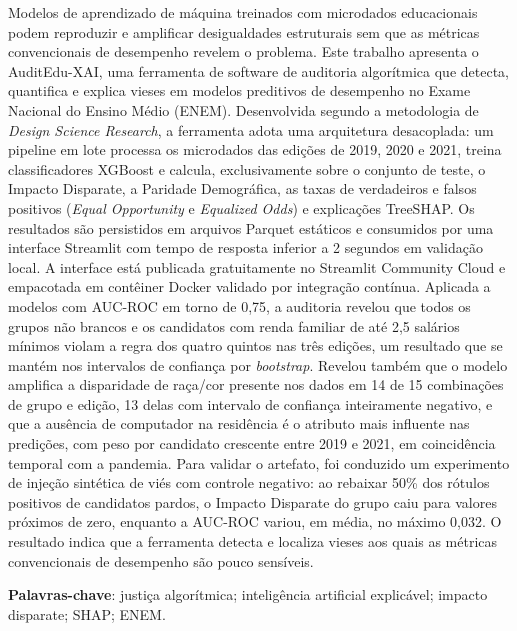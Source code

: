 \setlength{\absparsep}{18pt} %
\begin{resumo}

Modelos de aprendizado de máquina treinados com microdados educacionais podem reproduzir e amplificar desigualdades estruturais sem que as métricas convencionais de desempenho revelem o problema. Este trabalho apresenta o AuditEdu-XAI, uma ferramenta de software de auditoria algorítmica que detecta, quantifica e explica vieses em modelos preditivos de desempenho no Exame Nacional do Ensino Médio (ENEM). Desenvolvida segundo a metodologia de \textit{Design Science Research}, a ferramenta adota uma arquitetura desacoplada: um pipeline em lote processa os microdados das edições de 2019, 2020 e 2021, treina classificadores XGBoost e calcula, exclusivamente sobre o conjunto de teste, o Impacto Disparate, a Paridade Demográfica, as taxas de verdadeiros e falsos positivos (\textit{Equal Opportunity} e \textit{Equalized Odds}) e explicações TreeSHAP. Os resultados são persistidos em arquivos Parquet estáticos e consumidos por uma interface Streamlit com tempo de resposta inferior a 2 segundos em validação local. A interface está publicada gratuitamente no Streamlit Community Cloud e empacotada em contêiner Docker validado por integração contínua. Aplicada a modelos com AUC-ROC em torno de 0,75, a auditoria revelou que todos os grupos não brancos e os candidatos com renda familiar de até 2,5 salários mínimos violam a regra dos quatro quintos nas três edições, um resultado que se mantém nos intervalos de confiança por \textit{bootstrap}. Revelou também que o modelo amplifica a disparidade de raça/cor presente nos dados em 14 de 15 combinações de grupo e edição, 13 delas com intervalo de confiança inteiramente negativo, e que a ausência de computador na residência é o atributo mais influente nas predições, com peso por candidato crescente entre 2019 e 2021, em coincidência temporal com a pandemia. Para validar o artefato, foi conduzido um experimento de injeção sintética de viés com controle negativo: ao rebaixar 50\% dos rótulos positivos de candidatos pardos, o Impacto Disparate do grupo caiu para valores próximos de zero, enquanto a AUC-ROC variou, em média, no máximo 0,032. O resultado indica que a ferramenta detecta e localiza vieses aos quais as métricas convencionais de desempenho são pouco sensíveis.

\vspace{\onelineskip}

\noindent
\textbf{Palavras-chave}: justiça algorítmica; inteligência artificial explicável; impacto disparate; SHAP; ENEM.
\end{resumo}
